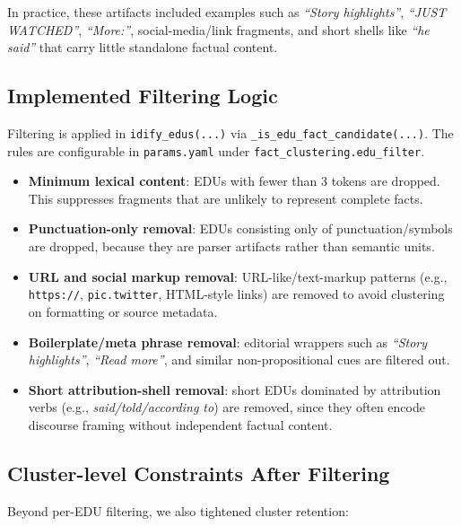 \documentclass[12pt,a4paper]{article}
\begin{document}
In practice, these artifacts included examples such as \textit{``Story highlights''},
\textit{``JUST WATCHED''}, \textit{``More:''}, social-media/link fragments, and short shells
like \textit{``he said''} that carry little standalone factual content.

\subsection{Implemented Filtering Logic}

Filtering is applied in \texttt{idify\_edus(...)} via
\texttt{\_is\_edu\_fact\_candidate(...)}.
The rules are configurable in \texttt{params.yaml} under \texttt{fact\_clustering.edu\_filter}.

\begin{itemize}
\item \textbf{Minimum lexical content}:
	EDUs with fewer than 3 tokens are dropped.
	This suppresses fragments that are unlikely to represent complete facts.

\item \textbf{Punctuation-only removal}:
	EDUs consisting only of punctuation/symbols are dropped,
	because they are parser artifacts rather than semantic units.

\item \textbf{URL and social markup removal}:
	URL-like/text-markup patterns (e.g., \texttt{https://}, \texttt{pic.twitter}, HTML-style links)
	are removed to avoid clustering on formatting or source metadata.

\item \textbf{Boilerplate/meta phrase removal}:
	editorial wrappers such as \textit{``Story highlights''}, \textit{``Read more''}, and similar
	non-propositional cues are filtered out.

\item \textbf{Short attribution-shell removal}:
	short EDUs dominated by attribution verbs (e.g., \textit{said/told/according to}) are removed,
	since they often encode discourse framing without independent factual content.
\end{itemize}

\subsection{Cluster-level Constraints After Filtering}

Beyond per-EDU filtering, we also tightened cluster retention:
\end{document}

